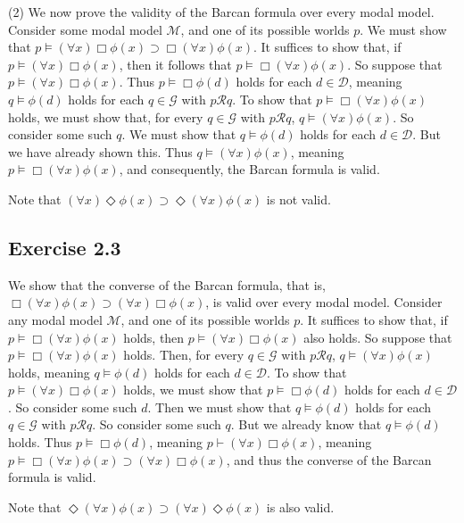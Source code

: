 \documentclass{article}
\theoremstyle{definition}
\begin{document}
(2) We now prove the validity of the Barcan formula over every modal model. Consider some modal model $\mathcal{M}$, and one of its possible worlds 
$p$. We must show that $p\vDash (\forall x)\Box\phi(x)\supset\Box(\forall x)\phi(x)$. It suffices to show that, if 
$p\vDash (\forall x)\Box\phi(x)$, then it follows that $p\vDash\Box(\forall x)\phi(x)$. So suppose that $p\vDash (\forall x)\Box\phi(x)$. 
Thus $p\vDash\Box\phi(d)$ holds for each $d\in\mathcal{D}$, meaning $q\vDash\phi(d)$ holds for each 
$q\in\mathcal{G}$ with $p\mathcal{R}q$. To show that $p\vDash\Box(\forall x)\phi(x)$ holds, we must show that, for every 
$q\in\mathcal{G}$ with $p\mathcal{R}q$, $q\vDash (\forall x)\phi(x)$. So consider some such $q$. We must show that 
$q\vDash\phi(d)$ holds for each $d\in\mathcal{D}$. But we have already shown this. Thus $q\vDash (\forall x)\phi(x)$, meaning 
$p\vDash\Box (\forall x)\phi(x)$, and consequently, the Barcan formula is valid.

Note that $(\forall x)\Diamond\phi(x)\supset\Diamond(\forall x)\phi(x)$ is not valid.

\subsection*{Exercise 2.3}
We show that the converse of the Barcan formula, that is, $\Box(\forall x)\phi(x)\supset (\forall x)\Box\phi(x)$, is valid over every 
modal model. Consider any modal model $\mathcal{M}$, and one of its possible worlds $p$. It suffices to show that, if 
$p\vDash\Box(\forall x)\phi(x)$ holds, then $p\vDash (\forall x)\Box\phi(x)$ also holds. So suppose that 
$p\vDash\Box(\forall x)\phi(x)$ holds. Then, for every $q\in\mathcal{G}$ with $p\mathcal{R}q$, 
$q\vDash (\forall x)\phi(x)$ holds, meaning $q\vDash \phi(d)$ holds for each $d\in\mathcal{D}$. To show that 
$p\vDash (\forall x)\Box\phi(x)$ holds, we must show that 
$p\vDash \Box\phi(d)$ holds for each $d\in\mathcal{D}$. So consider some such $d$. Then we must show that 
$q\vDash \phi(d)$ holds for each $q\in\mathcal{G}$ with $p\mathcal{R}q$. So consider some such $q$. But we already know that 
$q\vDash\phi(d)$ holds. Thus $p\vDash\Box\phi(d)$, meaning $p\vdash (\forall x)\Box\phi(x)$, meaning 
$p\vDash \Box(\forall x)\phi(x)\supset (\forall x)\Box\phi(x)$, and thus the converse of the Barcan formula is valid. 

Note that $\Diamond(\forall x)\phi(x)\supset(\forall x)\Diamond\phi(x)$ is also valid.
\end{document}
